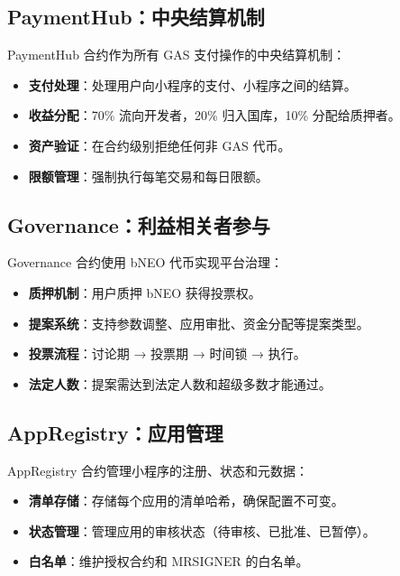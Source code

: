 \documentclass[11pt,a4paper]{article}
\begin{document}
\subsection{PaymentHub：中央结算机制}

PaymentHub 合约作为所有 GAS 支付操作的中央结算机制：

\begin{itemize}
    \item \textbf{支付处理}：处理用户向小程序的支付、小程序之间的结算。
    \item \textbf{收益分配}：70\% 流向开发者，20\% 归入国库，10\% 分配给质押者。
    \item \textbf{资产验证}：在合约级别拒绝任何非 GAS 代币。
    \item \textbf{限额管理}：强制执行每笔交易和每日限额。
\end{itemize}

\subsection{Governance：利益相关者参与}

Governance 合约使用 bNEO 代币实现平台治理：

\begin{itemize}
    \item \textbf{质押机制}：用户质押 bNEO 获得投票权。
    \item \textbf{提案系统}：支持参数调整、应用审批、资金分配等提案类型。
    \item \textbf{投票流程}：讨论期 → 投票期 → 时间锁 → 执行。
    \item \textbf{法定人数}：提案需达到法定人数和超级多数才能通过。
\end{itemize}

\subsection{AppRegistry：应用管理}

AppRegistry 合约管理小程序的注册、状态和元数据：

\begin{itemize}
    \item \textbf{清单存储}：存储每个应用的清单哈希，确保配置不可变。
    \item \textbf{状态管理}：管理应用的审核状态（待审核、已批准、已暂停）。
    \item \textbf{白名单}：维护授权合约和 MRSIGNER 的白名单。
\end{itemize}
\end{document}
